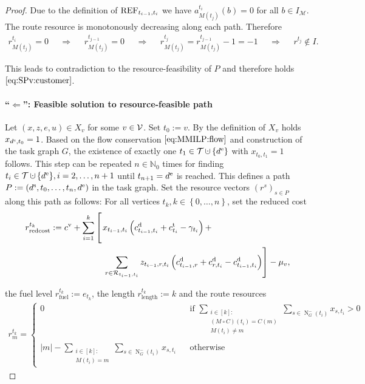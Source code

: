 \begin{proof}
Due to the definition of $\operatorname{REF}_{t_{i-1},t_i}$ we have ${a^{t_i}_{M\left(t_j\right)}(b) = 0}$ for all ${b\in I_{\mathcal{M}}}$. The route resource is monotonously decreasing along each path. Therefore
\begin{align*}
	r^{t_i}_{M\left(t_j\right)}=0 && \Rightarrow && r^{t_{j-1}}_{M\left(t_j\right)} = 0 && \Rightarrow && r^{t_j}_{M\left(t_j\right)} = r^{t_{j-1}}_{M\left(t_j\right)} - 1 = -1 && \Rightarrow && r^{t_j} \notin I.
\end{align*}

This leads to contradiction to the resource-feasibility of $P$ and therefore holds $\eqref{eq:SPv:customer}$.

\paragraph{\enquote{$\boldsymbol{\Leftarrow}$}: Feasible solution to resource-feasible path} \proofparfill

Let $(x,z,e,u)\in X_v$ for some $v\in\mathcal{V}$. Set ${t_0 := v}$. By the definition of $X_v$ holds ${x_{d^{\operatorname{s}},t_0} = 1}$. Based on the flow conservation $\eqref{eq:MMILP:flow}$ and construction of the task graph $G$, the existence of exactly one ${t_1\in\mathcal{T}\cupdot\left\{\de\right\}}$ with ${x_{t_0,t_1} = 1}$ follows. This step can be repeated ${n\in\mathbb{N}_0}$ times for finding ${t_i\in\mathcal{T}\cupdot\left\{\de\right\}}, {i = 2,\dots,n+1}$ until ${t_{n+1}=d^{\operatorname{e}}}$ is reached. This defines a path ${P:=\left(d^{\operatorname{s}},t_0,\dots,t_n,d^{\operatorname{e}}\right)}$ in the task graph. Set the resource vectors $\left(r^s\right)_{s\in P}$ along this path as follows: For all vertices $t_k, {k\in\left\{0,\dots,n\right\}}$, set the reduced cost
\begin{align*}
	r^{t_k}_{\operatorname{redcost}} := \cv + \sum_{i=1}^k\left[ \vphantom{\sum_{r\in\mathcal{R}_{t_{i-1}}}} \right. & x_{t_{i-1},t_i}\left(\cd_{t_{i-1},t_i}+\ct_{t_i}-\gamma_{t_i}\right) + \\
	& \left. \sum_{r\in\mathcal{R}_{t_{i-1},t_i}} z_{t_{i-1},r,t_i}\left(\cd_{t_{i-1},r}+\cd_{r,t_i}-\cd_{t_{i-1},t_i}\right)\right] - \mu_v,
\end{align*}

the fuel level ${r^{t_k}_{\operatorname{fuel}} := e_{t_k}}$, the length ${r^{t_k}_{\operatorname{length}} := k}$ and the route resources
\begin{align*}
	r^{t_k}_m = \left\{\begin{array}{ccl}
		0 && \displaystyle{\text{if } \sum_{ \substack{i\in[k]: \\ (M\circ C)\left(t_i\right) = C(m) \\ M\left(t_i\right) \neq m} } \sum_{s\in\operatorname{N}^-_{G}\left(t_i\right)} x_{s,t_i} > 0} \\ \\
		\displaystyle{\vert m\vert - \sum_{ \substack{i\in[k]: \\ M\left(t_i\right) = m} } \sum_{s\in\operatorname{N}^-_{G}\left(t_i\right)} x_{s,t_i}} && \text{otherwise}
	\end{array}\right.
\end{align*}


\end{proof}
